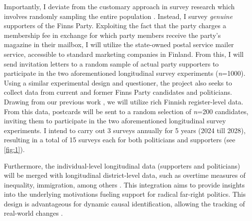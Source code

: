 \documentclass[letterpaper]{article}
\begin{document}
\vspace{2mm}Importantly, I deviate from the customary approach in survey research which involves randomly sampling the entire population \parencite{Mudde2007b}. Instead, I survey \emph{genuine} supporters of the Finns Party. Exploiting the fact that the party charges a membership fee in exchange for which party members receive the party's magazine in their mailbox, I will utilize the state-owned postal service mailer service, accessible to standard marketing companies in Finland. From this, I will send invitation letters to a random sample of actual party supporters to participate in the two aforementioned longitudinal survey experiments (\emph{n}=1000). Using a similar experimental design and questioner, the project also seeks to collect data from current and former Finns Party candidates and politicians. Drawing from our previous work \parencite{Bahamonde:2023}, we will utilize rich Finnish register-level data. From this data, postcards will be sent to a random selection of \emph{n}=200 candidates, inviting them to participate in the two aforementioned longitudinal survey experiments. I intend to carry out 3 surveys annually for 5 years (2024 till 2028), resulting in a total of 15 surveys each for both politicians and supporters (see \autoref{fig:1}).

\vspace{2mm}Furthermore, the individual-level longitudinal data (supporters and politicians) will be merged with longitudinal district-level data, such as overtime measures of inequality, immigration, among others \parencite{Dehdari2022,Kurer2019,Gidron2020}. This integration aims to provide insights into the underlying motivations fueling support for radical far-right politics. This design is advantageous for dynamic causal identification, allowing the tracking of real-world changes \parencite{Im2023}.
\end{document}
